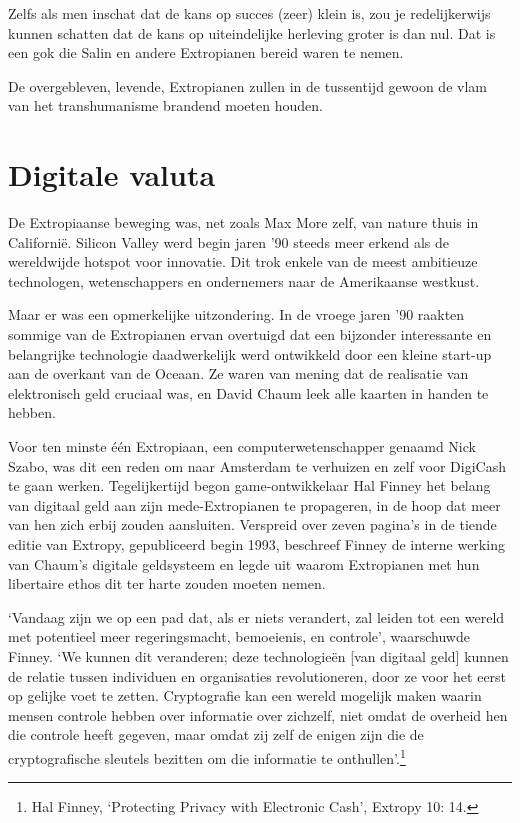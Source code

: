 \documentclass[
  a5paper,
  smalldemyvopaper,11pt,twoside,onecolumn,openright,extrafontsizes]{memoir}
\begin{document}
Zelfs als men inschat dat de kans op succes (zeer) klein is, zou je
redelijkerwijs kunnen schatten dat de kans op uiteindelijke herleving
groter is dan nul. Dat is een gok die Salin en andere Extropianen bereid
waren te nemen.

De overgebleven, levende, Extropianen zullen in de tussentijd gewoon de
vlam van het transhumanisme brandend moeten houden.

\section{Digitale valuta}\label{digitale-valuta}

De Extropiaanse beweging was, net zoals Max More zelf, van nature thuis
in Californië. Silicon Valley werd begin jaren '90 steeds meer erkend
als de wereldwijde hotspot voor innovatie. Dit trok enkele van de meest
ambitieuze technologen, wetenschappers en ondernemers naar de
Amerikaanse westkust.

Maar er was een opmerkelijke uitzondering. In de vroege jaren '90
raakten sommige van de Extropianen ervan overtuigd dat een bijzonder
interessante en belangrijke technologie daadwerkelijk werd ontwikkeld
door een kleine start-up aan de overkant van de Oceaan. Ze waren van
mening dat de realisatie van elektronisch geld cruciaal was, en David
Chaum leek alle kaarten in handen te hebben.

Voor ten minste één Extropiaan, een computerwetenschapper genaamd Nick
Szabo, was dit een reden om naar Amsterdam te verhuizen en zelf voor
DigiCash te gaan werken. Tegelijkertijd begon game-ontwikkelaar Hal
Finney het belang van digitaal geld aan zijn mede-Extropianen te
propageren, in de hoop dat meer van hen zich erbij zouden aansluiten.
Verspreid over zeven pagina's in de tiende editie van Extropy,
gepubliceerd begin 1993, beschreef Finney de interne werking van Chaum's
digitale geldsysteem en legde uit waarom Extropianen met hun libertaire
ethos dit ter harte zouden moeten nemen.

`Vandaag zijn we op een pad dat, als er niets verandert, zal leiden tot
een wereld met potentieel meer regeringsmacht, bemoeienis, en controle',
waarschuwde Finney. `We kunnen dit veranderen; deze technologieën {[}van
digitaal geld{]} kunnen de relatie tussen individuen en organisaties
revolutioneren, door ze voor het eerst op gelijke voet te zetten.
Cryptografie kan een wereld mogelijk maken waarin mensen controle hebben
over informatie over zichzelf, niet omdat de overheid hen die controle
heeft gegeven, maar omdat zij zelf de enigen zijn die de cryptografische
sleutels bezitten om die informatie te onthullen'.\footnote{Hal Finney,
  `Protecting Privacy with Electronic Cash', Extropy 10: 14.}
\end{document}
